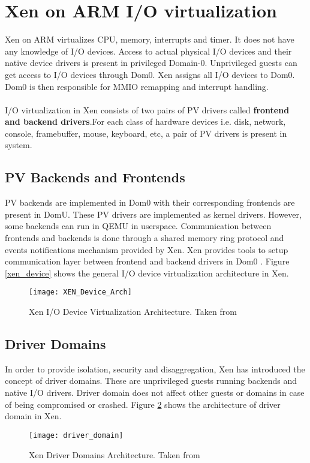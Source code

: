 \section{Xen on ARM I/O virtualization \label{sec:xendevice}}
Xen on ARM virtualizes CPU, memory, interrupts and timer. It does not have any knowledge of I/O devices. Access to actual physical I/O devices and their native device drivers is present in privileged Domain-0. Unprivileged guests can get access to I/O devices through Dom0. Xen assigns all I/O devices to Dom0. Dom0 is then responsible for MMIO remapping and interrupt handling. \\
\\
I/O virtualization in Xen consists of two pairs of PV drivers called \textbf{frontend and backend drivers}.For each class of hardware devices i.e. disk, network, console, framebuffer, mouse, keyboard, etc, a pair of PV drivers is present in system. 
\subsection{PV Backends and Frontends}
PV backends are implemented in Dom0 with their corresponding frontends are present in DomU. These PV drivers are implemented as kernel drivers. However, some backends can run in QEMU in userspace. Communication between frontends and backends is done through a shared memory ring protocol and events notifications mechanism provided by Xen. Xen provides tools to setup communication layer between frontend and backend drivers in Dom0 \cite{xen_arm}. Figure \ref{xen_device} shows the general I/O device virtualization architecture in Xen.
\begin{figure}[!htbp]
	\centering
	\texttt{[image: XEN\_Device\_Arch]}
	\caption{Xen I/O Device Virtualization Architecture. Taken from \cite{xen_arm}}
	\label{XEN_Device_Arch}
\end{figure}

\subsection{Driver Domains}
In order to provide isolation, security and disaggregation, Xen has introduced the concept of driver domains. These are unprivileged guests running backends and native I/O drivers. Driver domain does not affect other guests or domains in case of being compromised or crashed. Figure \ref{driver_domain} shows the architecture of driver domain in Xen.

\begin{figure}[!htbp]
	\centering
	\texttt{[image: driver\_domain]}
	\caption{Xen Driver Domains Architecture. Taken from \cite{xen_arm}}
	\label{driver_domain}
\end{figure}

